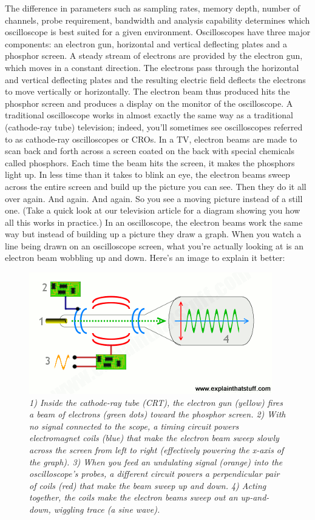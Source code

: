 \documentclass[letterpaper]{article}
\begin{document}
The difference in parameters such as sampling rates, memory depth, number of channels, probe requirement, bandwidth and analysis capability determines which oscilloscope is best suited for a given environment. Oscilloscopes have three major components: an electron gun, horizontal and vertical deflecting plates and a phosphor screen. A steady stream of electrons are provided by the electron gun, which moves in a constant direction. The electrons pass through the horizontal and vertical deflecting plates and the resulting electric field deflects the electrons to move vertically or horizontally. The electron beam thus produced hits the phosphor screen and produces a display on the monitor of the oscilloscope. A traditional oscilloscope works in almost exactly the same way as a traditional (cathode-ray tube) television; indeed, you'll sometimes see oscilloscopes referred to as cathode-ray oscilloscopes or CROs. In a TV, electron beams are made to scan back and forth across a screen coated on the back with special chemicals called phosphors. Each time the beam hits the screen, it makes the phosphors light up. In less time than it takes to blink an eye, the electron beams sweep across the entire screen and build up the picture you can see. Then they do it all over again. And again. And again. So you see a moving picture instead of a still one. (Take a quick look at our television article for a diagram showing you how all this works in practice.) In an oscilloscope, the electron beams work the same way but instead of building up a picture they draw a graph. When you watch a line being drawn on an oscilloscope screen, what you're actually looking at is an electron beam wobbling up and down.
Here’s an image to explain it better:     
\begin{figure}[H]
    \centering
    \includegraphics[width=.5\linewidth]{img/intro/how-works}
    \caption{\textit{
1) Inside the cathode-ray tube (CRT), the electron gun (yellow) fires a beam of electrons (green dots) toward the phosphor screen. 2) With no signal connected to the scope, a timing circuit powers electromagnet coils (blue) that make the electron beam sweep slowly across the screen from left to right (effectively powering the x-axis of the graph). 3) When you feed an undulating signal (orange) into the oscilloscope's probes, a different circuit powers a perpendicular pair of coils (red) that make the beam sweep up and down. 4) Acting together, the coils make the electron beams sweep out an up-and-down, wiggling trace (a sine wave).
}}
\end{figure}
\end{document}
